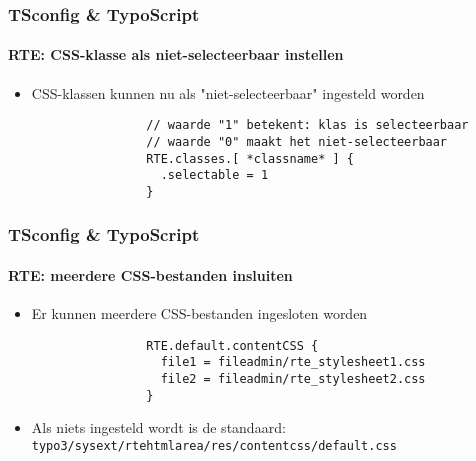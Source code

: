 
\begin{frame}[fragile]
	\frametitle{TSconfig \& TypoScript}
	\framesubtitle{RTE: CSS-klasse als niet-selecteerbaar instellen}

	\begin{itemize}
		\item CSS-klassen kunnen nu als "niet-selecteerbaar" ingesteld worden

			\begin{lstlisting}
				// waarde "1" betekent: klas is selecteerbaar
				// waarde "0" maakt het niet-selecteerbaar
				RTE.classes.[ *classname* ] {
				  .selectable = 1
				}
			\end{lstlisting}

	\end{itemize}

\end{frame}


\begin{frame}[fragile]
	\frametitle{TSconfig \& TypoScript}
	\framesubtitle{RTE: meerdere CSS-bestanden insluiten}

	\begin{itemize}
		\item Er kunnen meerdere CSS-bestanden ingesloten worden

			\begin{lstlisting}
				RTE.default.contentCSS {
				  file1 = fileadmin/rte_stylesheet1.css
				  file2 = fileadmin/rte_stylesheet2.css
				}
			\end{lstlisting}

		\item Als niets ingesteld wordt is de standaard:\newline
			\texttt{typo3/sysext/rtehtmlarea/res/contentcss/default.css}

	\end{itemize}

\end{frame}

